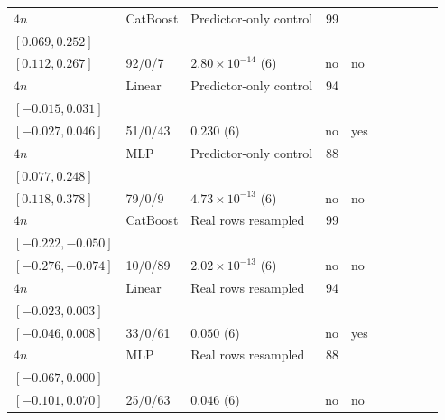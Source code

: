 \begin{longtable}{@{}ll>{\raggedright\arraybackslash}p{1.1in}rllrlll@{}}
$4n$ & CatBoost & Predictor-only control & 99 & \begin{tabular}[t]{@{}l@{}}$0.194$\\\tiny$[0.069, 0.252]$\end{tabular} & \begin{tabular}[t]{@{}l@{}}$0.197$\\\tiny$[0.112, 0.267]$\end{tabular} & 92/0/7 & $2.80\times 10^{-14}$ (6) & no & no \\
$4n$ & Linear & Predictor-only control & 94 & \begin{tabular}[t]{@{}l@{}}$0.001$\\\tiny$[-0.015, 0.031]$\end{tabular} & \begin{tabular}[t]{@{}l@{}}$0.008$\\\tiny$[-0.027, 0.046]$\end{tabular} & 51/0/43 & $0.230$ (6) & no & yes \\
$4n$ & MLP & Predictor-only control & 88 & \begin{tabular}[t]{@{}l@{}}$0.165$\\\tiny$[0.077, 0.248]$\end{tabular} & \begin{tabular}[t]{@{}l@{}}$0.227$\\\tiny$[0.118, 0.378]$\end{tabular} & 79/0/9 & $4.73\times 10^{-13}$ (6) & no & no \\
$4n$ & CatBoost & Real rows resampled & 99 & \begin{tabular}[t]{@{}l@{}}$-0.132$\\\tiny$[-0.222, -0.050]$\end{tabular} & \begin{tabular}[t]{@{}l@{}}$-0.179$\\\tiny$[-0.276, -0.074]$\end{tabular} & 10/0/89 & $2.02\times 10^{-13}$ (6) & no & no \\
$4n$ & Linear & Real rows resampled & 94 & \begin{tabular}[t]{@{}l@{}}$-0.008$\\\tiny$[-0.023, 0.003]$\end{tabular} & \begin{tabular}[t]{@{}l@{}}$-0.008$\\\tiny$[-0.046, 0.008]$\end{tabular} & 33/0/61 & $0.050$ (6) & no & yes \\
$4n$ & MLP & Real rows resampled & 88 & \begin{tabular}[t]{@{}l@{}}$-0.032$\\\tiny$[-0.067, 0.000]$\end{tabular} & \begin{tabular}[t]{@{}l@{}}$-0.037$\\\tiny$[-0.101, 0.070]$\end{tabular} & 25/0/63 & $0.046$ (6) & no & no \\

\end{longtable}
